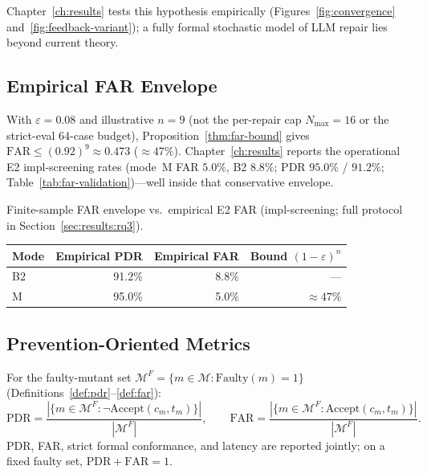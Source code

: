 \noindent
Chapter~\ref{ch:results} tests this hypothesis empirically
(Figures~\ref{fig:convergence} and~\ref{fig:feedback-variant}); a fully formal
stochastic model of LLM repair lies beyond current theory.

\subsection{Empirical FAR Envelope}
\label{subsec:far-validation}

With $\varepsilon = 0.08$ and illustrative $n = 9$ (not the per-repair cap
$N_{\max}{=}16$ or the strict-eval 64-case budget), Proposition~\ref{thm:far-bound} gives
$\mathrm{FAR} \leq (0.92)^9 \approx 0.473$ ($\approx 47\%$).
Chapter~\ref{ch:results} reports the operational E2 impl-screening rates
(mode~M FAR $5.0\%$, B2 $8.8\%$; PDR $95.0\%$ / $91.2\%$;
Table~\ref{tab:far-validation})---well inside that conservative envelope.

\begin{inlinetable}{Finite-sample FAR envelope vs.\ empirical E2 FAR
  (impl-screening; full protocol in Section~\ref{sec:results:rq3}).}
  \label{tab:far-validation}
  \footnotesize
  \begin{tabular}{lrrr}
    \toprule
    Mode & Empirical PDR & Empirical FAR & Bound $(1-\varepsilon)^n$ \\
    \midrule
    B2  & 91.2\% & 8.8\% & --- \\
    M   & 95.0\% & 5.0\% & $\approx 47\%$ \\
    \bottomrule
  \end{tabular}
\end{inlinetable}

\subsection{Prevention-Oriented Metrics}
\label{subsec:metrics}

For the faulty-mutant set $\mathcal{M}^F=\{m\in\mathcal{M}:\mathrm{Faulty}(m)=1\}$
(Definitions~\ref{def:pdr}--\ref{def:far}):
\begin{equation}
  \mathrm{PDR} = \frac{|\{m \in \mathcal{M}^F : \neg\mathrm{Accept}(c_m, t_m)\}|}{|\mathcal{M}^F|},
  \qquad
  \mathrm{FAR} = \frac{|\{m \in \mathcal{M}^F : \mathrm{Accept}(c_m, t_m)\}|}{|\mathcal{M}^F|}.
\end{equation}
PDR, FAR, strict formal conformance, and latency are reported jointly;
on a fixed faulty set, $\mathrm{PDR}+\mathrm{FAR}=1$.

